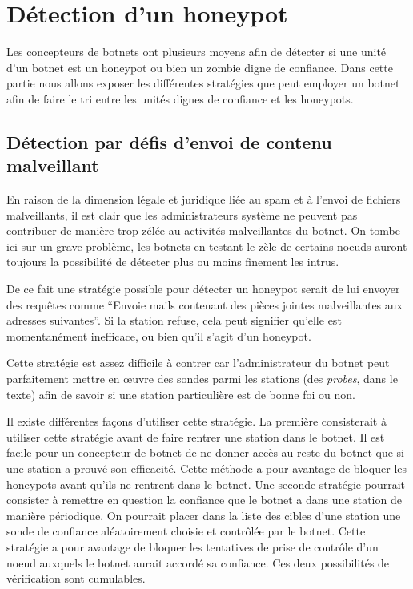 \section{Détection d'un honeypot}

Les concepteurs de botnets ont plusieurs moyens afin de détecter si
une unité d'un botnet est un honeypot ou bien un zombie digne de confiance.
Dans cette partie nous allons exposer les différentes stratégies que peut employer
un botnet afin de faire le tri entre les unités dignes de confiance et les honeypots.

\subsection{Détection par défis d'envoi de contenu malveillant}

En raison de la dimension légale et juridique liée au spam et à l'envoi de fichiers malveillants,
il est clair que les administrateurs système ne peuvent pas contribuer de manière trop zélée au
activités malveillantes du botnet. On tombe ici sur un grave problème, les botnets en testant le
zèle de certains noeuds auront toujours la possibilité de détecter plus ou moins finement les intrus.

De ce fait une stratégie possible pour détecter un honeypot serait de lui envoyer des requêtes comme
``Envoie  mails contenant des pièces jointes malveillantes aux adresses suivantes''. Si la 
station refuse, cela peut signifier qu'elle est momentanément inefficace, ou bien qu'il s'agit d'un honeypot.

Cette stratégie est assez difficile à contrer car l'administrateur du botnet peut parfaitement mettre en œuvre des sondes parmi les stations (des \textit{probes}, dans le texte) afin de savoir si une station particulière est de bonne foi
ou non.

Il existe différentes façons d'utiliser cette stratégie.
La première consisterait à utiliser cette stratégie avant de faire rentrer une station dans le botnet.
Il est facile pour un concepteur de botnet de ne donner accès au reste du botnet que si une station
a prouvé son efficacité. Cette méthode a pour avantage de bloquer les honeypots avant qu'ils ne rentrent
dans le botnet.
Une seconde stratégie pourrait consister à remettre en question la confiance que le botnet a dans une station 
de manière périodique. On pourrait placer dans la liste des cibles d'une station une sonde
de confiance aléatoirement choisie et contrôlée par le botnet. Cette stratégie a pour avantage de bloquer les tentatives de prise
de contrôle d'un noeud auxquels le botnet aurait accordé sa confiance.
Ces deux possibilités de vérification sont cumulables.

